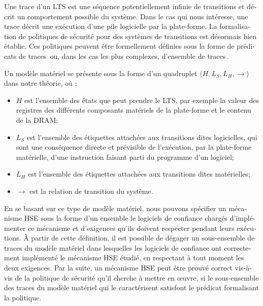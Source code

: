 \begin{otherlanguage}{french}
  Une trace d’un LTS est une séquence potentiellement infinie de transitions et
  décrit un comportement possible du système. Dans le cas qui nous intéresse,
  une trace décrit une exécution d’une pile logicielle par la plate-forme.
  La formalisation de politiques de sécurité pour des systèmes de transitions
  est désormais bien établie.
  Ces politiques peuvent être formellement définies sous la forme de prédicats
  de
  traces\,\cite{lamport1977proving,lamport1985logical,lamport1985logical,alpern1985liveness}
  ou, dans les cas les plus complexes, d’ensemble de
  traces\,\cite{clarkson2010hyperproperties}.

  Un modèle matériel se présente sous la forme d’un quadruplet
  \( \langle H, L_S, L_H, \rightarrow \rangle \) dans notre théorie, où :
  \begin{itemize}
  \item \( H \) est l’ensemble des états que peut prendre le LTS, par exemple la
    valeur des registres des différents composants matériels de la plate-forme
    et le contenu de la DRAM;
  \item \( L_S \) est l’ensemble des étiquettes attachées aux transitions dites
    logicielles, qui sont une conséquence directe et prévisible de l’exécution,
    par la plate-forme matérielle, d’une instruction faisant parti du programme
    d’un logiciel;
  \item \( L_H \) est l’ensemble des étiquettes attachées aux transitions dites
    matérielles;
  \item \( \rightarrow \) est la relation de transition du système.
  \end{itemize}

  En se basant sur ce type de modèle matériel, nous pouvons spécifier un
  mécanisme HSE sous la forme d’un ensemble le logiciels de confiance chargés
  d’implémenter ce mécanisme et d’exigences qu’ils doivent respecter pendant
  leurs exécutions.
  À partir de cette définition, il est possible de dégager un sous-ensemble de
  traces du modèle matériel dans lesquelles les logiciels de confiance ont
  correctement implémenté le mécanisme HSE étudié, en respectant à tout moment
  les deux exigences.
  Par la suite, un mécanisme HSE peut être prouvé correct vis-à-vis de la
  politique de sécurité qu’il cherche à mettre en œuvre, si le sous-ensemble des
  traces du modèle matériel qui le caractérisent satisfont le prédicat
  formalisant la politique.


\end{otherlanguage}
